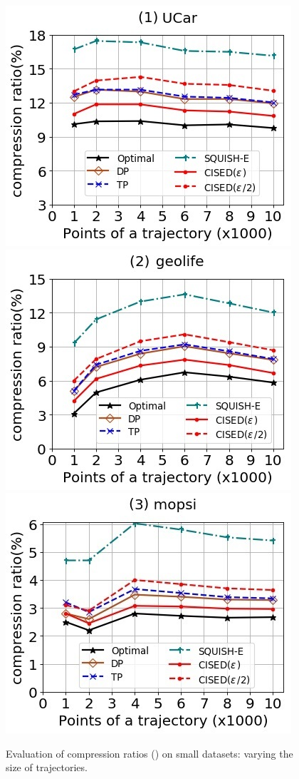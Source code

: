 \begin{figure}[tb!]
	\centering
	\includegraphics[scale=0.500]{Figures/Exp-SED-CR-size-service.jpg} 	\hspace{2ex}
	\includegraphics[scale=0.500]{Figures/Exp-SED-CR-size-geolife.jpg}	\hspace{2ex}
	\includegraphics[scale=0.500]{Figures/Exp-SED-CR-size-mopsi.jpg}		
	\vspace{-2ex}
	
	\caption{\small Evaluation of compression ratios (\sed) on small datasets: varying the size of
		trajectories.}
	\label{fig:cr-sed-size}
	\vspace{-2ex}
\end{figure}
